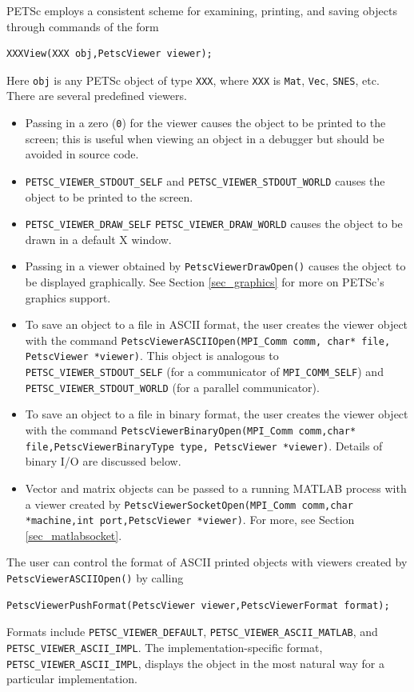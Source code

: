 {{{PETSc employs a consistent scheme for examining, printing, and
saving objects through commands of the form
\begin{lstlisting}
XXXView(XXX obj,PetscViewer viewer);
\end{lstlisting}
Here \lstinline{obj} is any PETSc object of type
\lstinline{XXX},  where \lstinline{XXX}
is \lstinline{Mat}, \lstinline{Vec}, \lstinline{SNES}, etc. There are several
predefined viewers.
\begin{itemize}
  \item Passing in a zero (\lstinline{0}) for the viewer causes the object to be printed
      to the screen; this is useful when viewing an object in
      a debugger but should be avoided in source code.
    \item \lstinline{PETSC_VIEWER_STDOUT_SELF} and
      \lstinline{PETSC_VIEWER_STDOUT_WORLD}
      causes the object to be printed to the screen.
    \item \lstinline{PETSC_VIEWER_DRAW_SELF}
      \lstinline{PETSC_VIEWER_DRAW_WORLD} causes the
      object to be drawn in a default X window.
\item Passing in a viewer obtained by
      \lstinline{PetscViewerDrawOpen()} causes the object to be displayed graphically.
      See Section \ref{sec_graphics} for more on PETSc's graphics support.
\item To save an object to a file in ASCII format, the user creates
      the viewer object with the command
      \lstinline{PetscViewerASCIIOpen(MPI_Comm comm, char* file, PetscViewer *viewer)}.
      This object is
      analogous to \lstinline{PETSC_VIEWER_STDOUT_SELF} (for a communicator of
      \lstinline{MPI_COMM_SELF}) and
      \lstinline{PETSC_VIEWER_STDOUT_WORLD} (for a parallel communicator).
\item To save an object to a file in binary format, the user creates
      the viewer object with the command
      \lstinline{PetscViewerBinaryOpen(MPI_Comm comm,char* file,PetscViewerBinaryType type, PetscViewer *viewer)}. Details of binary
      I/O are discussed below.
\item Vector and matrix objects can be passed to a running MATLAB process
      with a viewer created by
    \lstinline{PetscViewerSocketOpen(MPI_Comm comm,char *machine,int port,PetscViewer *viewer)}.
    For more, see Section \ref{sec_matlabsocket}.
\end{itemize}

The user can control the format of ASCII printed objects with viewers
created by \break\lstinline{PetscViewerASCIIOpen()} by calling
\begin{lstlisting}
PetscViewerPushFormat(PetscViewer viewer,PetscViewerFormat format);
\end{lstlisting}
 
Formats include
\lstinline{PETSC_VIEWER_DEFAULT}, \lstinline{PETSC_VIEWER_ASCII_MATLAB}, and
\lstinline{PETSC_VIEWER_ASCII_IMPL}.  The implementation-specific format,
\lstinline{PETSC_VIEWER_ASCII_IMPL}, displays the object in the most natural way
for a particular implementation.

}}}
